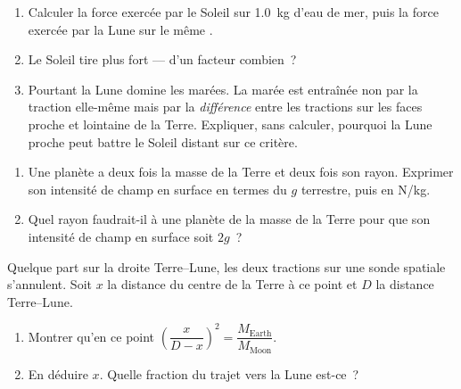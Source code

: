 \begin{exercise}[$\star\star$]\label{exo:g10:universal-gravitation:10}
\begin{enumerate}
  \item Calculer la force exercée par le Soleil sur \qty{1.0}{kg} d'eau
        de mer, puis la force exercée par la Lune sur le même
        .
  \item Le Soleil tire plus fort --- d'un facteur combien~?
  \item Pourtant la Lune domine les marées. La marée est entraînée non
        par la traction elle-même mais par la \emph{différence} entre
        les tractions sur les faces proche et lointaine de la Terre.
        Expliquer, sans calculer, pourquoi la Lune proche peut battre
        le Soleil distant sur ce critère.
\end{enumerate}
\end{exercise}

\begin{exercise}[$\star\star$]\label{exo:g10:universal-gravitation:11}
\begin{enumerate}
  \item Une planète a deux fois la masse de la Terre et deux fois son
        rayon. Exprimer son intensité de champ en surface en termes du
        $g$ terrestre, puis en \unit{N/kg}.
  \item Quel rayon faudrait-il à une planète de la masse de la Terre
        pour que son intensité de champ en surface soit $2g$~?
\end{enumerate}
\end{exercise}

\begin{exercise}[$\star\star\star$]\label{exo:g10:universal-gravitation:12}
Quelque part sur la droite Terre--Lune, les deux tractions sur une
sonde spatiale s'annulent. Soit $x$ la distance du centre de la Terre à
ce point et $D$ la distance Terre--Lune.
\begin{enumerate}
  \item Montrer qu'en ce point
        $\left(\dfrac{x}{D - x}\right)^{2}
        = \dfrac{M_{\text{Earth}}}{M_{\text{Moon}}}$.
  \item En déduire $x$. Quelle fraction du trajet vers la Lune
        est-ce~?
\end{enumerate}
\end{exercise}

